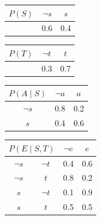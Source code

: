 \vspace{0.6cm}

\begin{minipage}{0.45\textwidth}
    \centering
    \begin{tabular}{c|cc}
    \toprule
    $P(S)$ & $\lnot s$ & $s$ \\
    \midrule
           & 0.6       & 0.4 \\
    \bottomrule
    \end{tabular}
\end{minipage}\hfill
\begin{minipage}{0.45\textwidth}
    \centering
    \begin{tabular}{c|cc}
    \toprule
    $P(T)$ & $\lnot t$ & $t$ \\
    \midrule
           & 0.3       & 0.7 \\
    \bottomrule
    \end{tabular}
\end{minipage}

\vspace{0.6cm}

\begin{minipage}{0.45\textwidth}
    \centering
    \begin{tabular}{c|cc}
    \toprule
    $P(A \mid S)$ & $\lnot a$ & $a$ \\
    \midrule
    $\lnot s$ & 0.8 & 0.2 \\
    $s$       & 0.4 & 0.6 \\
    \bottomrule
    \end{tabular}
\end{minipage}\hfill
\begin{minipage}{0.45\textwidth}
    \centering
    \begin{tabular}{cc|cc}
    \toprule
    \multicolumn{2}{c}{$P(E \mid S,T)$} & $\lnot e$ & $e$ \\
    \midrule
    $\lnot s$ & $\lnot t$ & 0.4 & 0.6 \\
    $\lnot s$ & $t$       & 0.8 & 0.2 \\
    $s$       & $\lnot t$ & 0.1 & 0.9 \\
    $s$       & $t$       & 0.5 & 0.5 \\
    \bottomrule
    \end{tabular}
\end{minipage}

